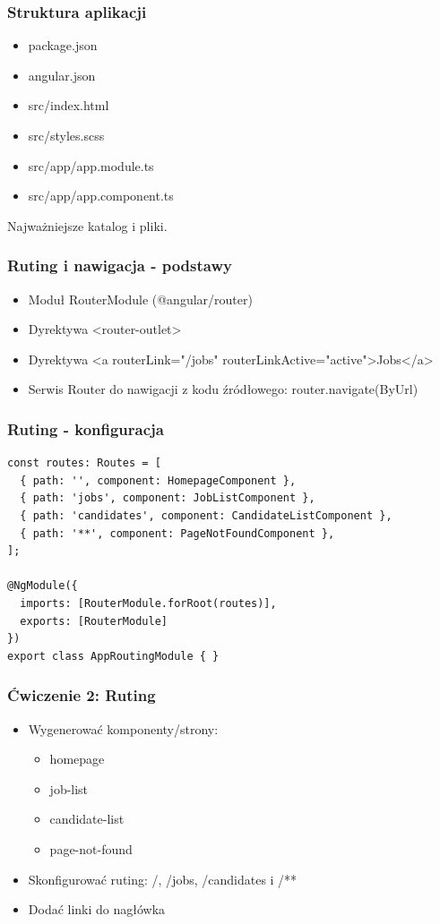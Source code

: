 \documentclass{beamer}
\begin{document}
\begin{frame}
    \frametitle{Struktura aplikacji}
    \begin{itemize}
        \item package.json
        \item angular.json
        \item src/index.html
        \item src/styles.scss
	\item src/app/app.module.ts
	\item src/app/app.component.ts
    \end{itemize}

    Najważniejsze katalog i pliki.
\end{frame}

\begin{frame}
    \frametitle{Ruting i nawigacja - podstawy}
    \begin{itemize}
        \item Moduł RouterModule (@angular/router)
        \item Dyrektywa <router-outlet>
        \item Dyrektywa <a routerLink="/jobs" routerLinkActive="active">Jobs</a>
        \item Serwis Router do nawigacji z kodu źródłowego: router.navigate(ByUrl)
    \end{itemize}
\end{frame}

\begin{frame}[fragile]
    \frametitle{Ruting - konfiguracja}
\begin{lstlisting}
const routes: Routes = [
  { path: '', component: HomepageComponent },
  { path: 'jobs', component: JobListComponent },
  { path: 'candidates', component: CandidateListComponent },
  { path: '**', component: PageNotFoundComponent },
];

@NgModule({
  imports: [RouterModule.forRoot(routes)],
  exports: [RouterModule]
})
export class AppRoutingModule { }
\end{lstlisting}
\end{frame}

\begin{frame}
    \frametitle{Ćwiczenie 2: Ruting}
    \begin{itemize}
        \item Wygenerować komponenty/strony:
	    \begin{itemize}
                \item homepage
		\item job-list
		\item candidate-list
		\item page-not-found
	    \end{itemize}
        \item Skonfigurować ruting: /, /jobs, /candidates i /**
        \item Dodać linki do nagłówka
    \end{itemize}
\end{frame}
\end{document}
